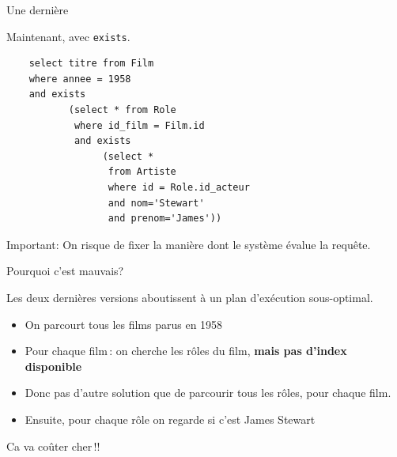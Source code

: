 \begin{frame}[fragile]{Une dernière}


Maintenant, avec \texttt{exists}.
\vfill

\begin{verbatim}
    select titre from Film
    where annee = 1958
    and exists
           (select * from Role
            where id_film = Film.id
            and exists 
                 (select * 
                  from Artiste
                  where id = Role.id_acteur
                  and nom='Stewart'
                  and prenom='James'))
\end{verbatim}

\alert{Important}: On risque de fixer la manière dont le système évalue la requête.
\end{frame}

\begin{frame}{Pourquoi c'est mauvais?}

Les deux dernières versions aboutissent à un plan d'exécution sous-optimal.

\begin{itemize}
  \item On parcourt tous les films parus en 1958

  \item Pour chaque film\,: on cherche les rôles
       du film, \textbf{mais pas d'index disponible}

  \item Donc pas d'autre solution que de parcourir tous les rôles, \alert{pour chaque film}.
   
  \item Ensuite, pour chaque rôle on regarde si c'est James Stewart
\end{itemize}

Ca va coûter cher\,!!
\end{frame}



